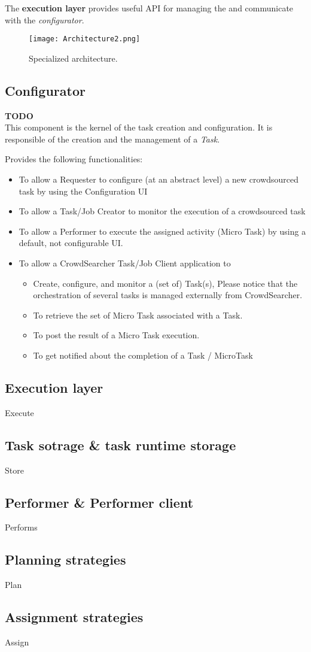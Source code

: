 The \textbf{execution layer} provides useful API for managing the \utask{} and
communicate with the \emph{configurator}.

\begin{figure}[tb]
	\centering
	\texttt{[image: Architecture2.png]}
	\caption{Specialized architecture.}
	\label{fig:architecture2}
\end{figure}





\subsection{Configurator}
\textbf{TODO}\\
This component is the kernel of the task creation and configuration. It is responsible
of the creation and the management of a \emph{Task}.

Provides
the following functionalities:
\begin{itemize}
	\item To allow a Requester to configure (at an abstract level) a new
	crowdsourced task by using the Configuration UI

	\item To allow a Task/Job Creator to monitor the execution of a crowdsourced
	task

	\item To allow a Performer to execute the assigned activity (Micro Task) by
	using a default, not configurable UI.

	\item To allow a CrowdSearcher Task/Job Client application to
	\begin{itemize}
		\item Create, configure, and monitor a (set of) Task(s), Please notice
		that the orchestration of several tasks is managed externally from
		CrowdSearcher.

		\item To retrieve the set of Micro Task associated with a Task.

		\item To post the result of a Micro Task execution.

		\item To get notified about the completion of a Task / MicroTask
	\end{itemize}
\end{itemize}

\subsection{Execution layer}
Execute
\subsection{Task sotrage \& task runtime storage}
Store
\subsection{Performer \& Performer client}
Performs
\subsection{Planning strategies}
Plan
\subsection{Assignment strategies}
Assign